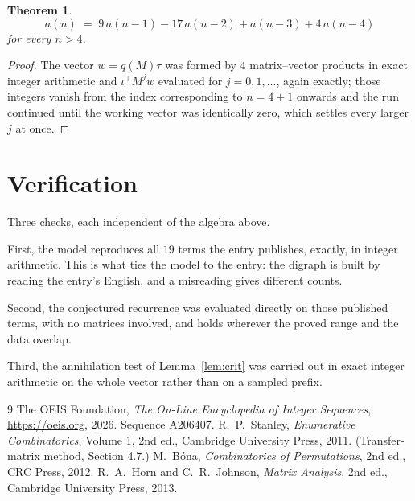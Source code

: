 \documentclass[11pt,a4paper]{article}
\theoremstyle{plain}
\newtheorem{theorem}{Theorem}
\theoremstyle{definition}
\begin{document}
\begin{theorem}
\[
a(n)\;=\;9\,a(n-1) - 17\,a(n-2) + a(n-3) + 4\,a(n-4)
\]
for every $n>4$.
\end{theorem}

\begin{proof}
The vector $w=q(M)\tau$ was formed by $4$ matrix--vector products in exact integer
arithmetic and $\iota^{\!\top}M^{j}w$ evaluated for $j=0,1,\dots$, again exactly; those
integers vanish from the index corresponding to $n=4+1$ onwards and the run continued
until the working vector was identically zero, which settles every larger $j$ at once.
\end{proof}

\section{Verification}

Three checks, each independent of the algebra above.

First, the model reproduces all $19$ terms the entry publishes, exactly, in integer
arithmetic. This is what ties the model to the entry: the digraph is built by reading the
entry's English, and a misreading gives different counts.

Second, the conjectured recurrence was evaluated directly on those published terms, with no
matrices involved, and holds wherever the proved range and the data overlap.

Third, the annihilation test of Lemma~\ref{lem:crit} was carried out in exact integer
arithmetic on the whole vector rather than on a sampled prefix.

\begin{thebibliography}{9}
 The OEIS Foundation, \emph{The On-Line Encyclopedia of Integer
Sequences}, \url{https://oeis.org}, 2026. Sequence A206407.
 R.~P.~Stanley, \emph{Enumerative Combinatorics}, Volume 1, 2nd ed.,
Cambridge University Press, 2011. (Transfer-matrix method, Section 4.7.)
 M.~B\'ona, \emph{Combinatorics of Permutations}, 2nd ed., CRC
Press, 2012.
 R.~A.~Horn and C.~R.~Johnson, \emph{Matrix Analysis}, 2nd ed., Cambridge
University Press, 2013.
\end{thebibliography}
\end{document}

